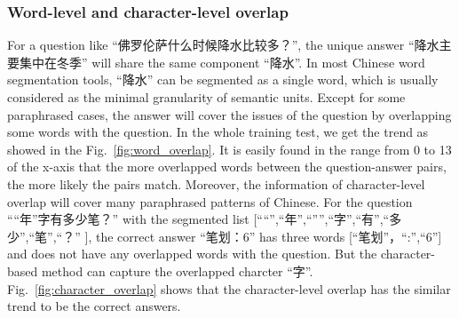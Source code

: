 \documentclass{llncs}
\begin{document}
\subsubsection{Word-level and character-level overlap}

For a question like ``佛罗伦萨什么时候降水比较多？'', the unique answer ``降水主要集中在冬季'' will share the same component ``降水''. In most Chinese word segmentation tools, ``降水'' can be
segmented as a single word, which is usually considered as the minimal granularity of semantic units. Except for some paraphrased cases, the answer will cover the issues of the question by overlapping some words with the question. In the whole training test, we get the trend as showed in the Fig.~\ref{fig:word_overlap}. It is easily found in the range from 0 to 13 of the x-axis that the more overlapped words between the question-answer pairs, the more likely the pairs match. Moreover, the information of character-level overlap will cover many paraphrased patterns of Chinese. For the question ``“年”字有多少笔？'' with the segmented list [``“'',``年'',``”'',``字'',``有'',``多少'',``笔'',``？'' ], the correct answer ``笔划：6'' has three words [``笔划''，``:'',``6''] and does not have any overlapped words with the question. But the character-based method can capture the overlapped charcter ``字''.  
Fig.~\ref{fig:character_overlap} shows that the character-level overlap has the similar trend to be the correct answers. 


\end{document}
